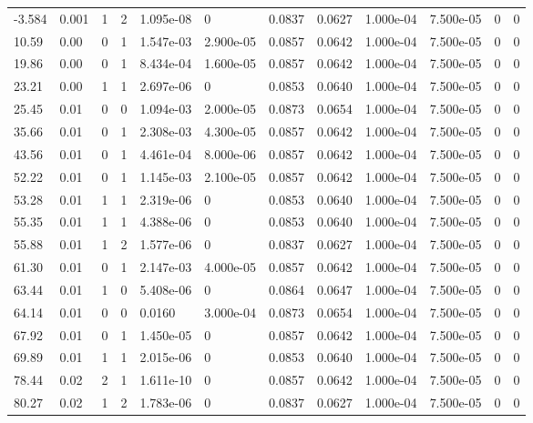 \documentclass[preview]{standalone}
\begin{document}
{{\begin{tabular}{L{1.2cm}C{1.2cm} C{0.3cm}C{0.5cm} C{1.4cm}C{1.4cm} C{1.4cm}C{1.4cm} C{1.6cm}C{1.6cm} C{1.6cm}C{1.6cm}}
  -3.584  &  0.001  & 1     &  2 &  1.095e-08  & 0  &  0.0837&   0.0627& 1.000e-04 & 7.500e-05   &  0 & 0  \\ 
  10.59  &  0.00  & 0     &  1 &  1.547e-03  & 2.900e-05  &  0.0857&   0.0642& 1.000e-04 & 7.500e-05   &  0 & 0  \\ 
  19.86  &  0.00  & 0     &  1 &  8.434e-04  & 1.600e-05  &  0.0857&   0.0642& 1.000e-04 & 7.500e-05   &  0 & 0  \\ 
  23.21  &  0.00  & 1     &  1 &  2.697e-06  & 0  &  0.0853&   0.0640& 1.000e-04 & 7.500e-05   &  0 & 0  \\ 
  25.45  &  0.01  & 0     &  0 &  1.094e-03  & 2.000e-05  &  0.0873&   0.0654& 1.000e-04 & 7.500e-05   &  0 & 0  \\ 
  35.66  &  0.01  & 0     &  1 &  2.308e-03  & 4.300e-05  &  0.0857&   0.0642& 1.000e-04 & 7.500e-05   &  0 & 0  \\ 
  43.56  &  0.01  & 0     &  1 &  4.461e-04  & 8.000e-06  &  0.0857&   0.0642& 1.000e-04 & 7.500e-05   &  0 & 0  \\ 
  52.22  &  0.01  & 0     &  1 &  1.145e-03  & 2.100e-05  &  0.0857&   0.0642& 1.000e-04 & 7.500e-05   &  0 & 0  \\ 
  53.28  &  0.01  & 1     &  1 &  2.319e-06  & 0  &  0.0853&   0.0640& 1.000e-04 & 7.500e-05   &  0 & 0  \\ 
  55.35  &  0.01  & 1     &  1 &  4.388e-06  & 0  &  0.0853&   0.0640& 1.000e-04 & 7.500e-05   &  0 & 0  \\ 
  55.88  &  0.01  & 1     &  2 &  1.577e-06  & 0  &  0.0837&   0.0627& 1.000e-04 & 7.500e-05   &  0 & 0  \\ 
  61.30  &  0.01  & 0     &  1 &  2.147e-03  & 4.000e-05  &  0.0857&   0.0642& 1.000e-04 & 7.500e-05   &  0 & 0  \\ 
  63.44  &  0.01  & 1     &  0 &  5.408e-06  & 0  &  0.0864&   0.0647& 1.000e-04 & 7.500e-05   &  0 & 0  \\ 
  64.14  &  0.01  & 0     &  0 &  0.0160  & 3.000e-04  &  0.0873&   0.0654& 1.000e-04 & 7.500e-05   &  0 & 0  \\ 
  67.92  &  0.01  & 0     &  1 &  1.450e-05  & 0  &  0.0857&   0.0642& 1.000e-04 & 7.500e-05   &  0 & 0  \\ 
  69.89  &  0.01  & 1     &  1 &  2.015e-06  & 0  &  0.0853&   0.0640& 1.000e-04 & 7.500e-05   &  0 & 0  \\ 
  78.44  &  0.02  & 2     &  1 &  1.611e-10  & 0  &  0.0857&   0.0642& 1.000e-04 & 7.500e-05   &  0 & 0  \\ 
  80.27  &  0.02  & 1     &  2 &  1.783e-06  & 0  &  0.0837&   0.0627& 1.000e-04 & 7.500e-05   &  0 & 0  \\ 

\end{tabular}}}
\end{document}
